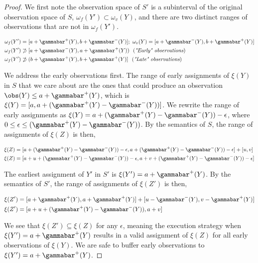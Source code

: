 \documentclass[11pt]{article}
\begin{document}
\begin{proof}
We first note the observation space of \(S'\) is a subinterval of the original observation space of
\(S\), \(\omega_{f}(Y') \subset \omega_{v}(Y)\), and there are two distinct ranges of observations that
are not in \(\omega_{f}(Y')\).

\begin{align*}
\omega_{f}(Y') &= [a + \gammabar^+(Y), b + \gammabar^-(Y)];~\omega_{v}(Y) = [a + \gammabar^-(Y), b + \gammabar^+(Y)] \\
\omega_{f}(Y') &\not\supset [a + \gammabar^-(Y), a + \gammabar^+(Y))~~(\textit{"Early" observations}) \\
\omega_{f}(Y') &\not\supset (b + \gammabar^+(Y), b + \gammabar^+(Y)]~~(\textit{"Late" observations})
\end{align*}

We address the early observations first. The range of early assignments of \(\xi(Y)\) in \(S\) that we
care about are the ones that could produce an observation \(\obs(Y) \leq a + \gammabar^+(Y)\), which
is \(\xi(Y) = [a, a + (\gammabar^+(Y) - \gammabar^-(Y))]\). We rewrite the range of early assignments
as \(\xi(Y) = a + (\gammabar^+(Y) - \gammabar^-(Y)) - \epsilon\), where \(0 \leq \epsilon \leq
(\gammabar^+(Y) - \gammabar^-(Y))\). By the semantics of \(S\), the range of assignments of \(\xi(Z)\) is
then,

\begin{align*}
\xi(Z) &= [a + (\gammabar^+(Y) - \gammabar^-(Y)) - \epsilon, a + (\gammabar^+(Y) - \gammabar^-(Y)) - \epsilon] + [u, v] \\
\xi(Z) &= [a + u + (\gammabar^+(Y) - \gammabar^-(Y)) - \epsilon, a + v + (\gammabar^+(Y) - \gammabar^-(Y)) - \epsilon]
\end{align*}

The earliest assignment of \(Y'\) in \(S'\) is \(\xi(Y') = a + \gammabar^+(Y)\). By the semantics of \(S'\),
the range of assignments of \(\xi(Z')\) is then,

\begin{align*}
\xi(Z') &= [a + \gammabar^+(Y), a + \gammabar^+(Y)] + [u - \gammabar^-(Y), v - \gammabar^+(Y)] \\
\xi(Z') &= [a + u + (\gammabar^+(Y) - \gammabar^-(Y)), a + v]
\end{align*}

We see that \(\xi(Z') \subseteq \xi(Z)\) for any \(\epsilon\), meaning the execution strategy when
\(\xi(Y') = a + \gammabar^+(Y)\) results in a valid assignment of \(\xi(Z)\) for all early observations
of \(\xi(Y)\). We are safe to buffer early observations to \(\xi(Y') = a + \gammabar^+(Y)\).


\end{proof}
\end{document}
